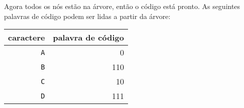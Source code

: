 Agora todos os nós estão na árvore, então o código está pronto.
As seguintes palavras de código podem ser lidas a partir da árvore:
\begin{center}
\begin{tabular}{rr}
caractere & palavra de código \\
\hline
\texttt{A} & 0 \\
\texttt{B} & 110 \\
\texttt{C} & 10 \\
\texttt{D} & 111 \\
\end{tabular}
\end{center}
